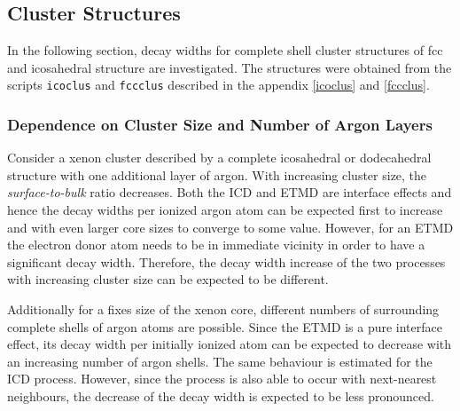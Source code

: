 

\subsection{Cluster Structures}
In the following section, decay widths for complete shell cluster structures
of \ac{fcc} and icosahedral structure are investigated. The structures were
obtained from the scripts \verb|icoclus| and \verb|fccclus| described in
the appendix \ref{icoclus} and \ref{fccclus}.

\subsubsection{Dependence on Cluster Size and Number of Argon Layers}
Consider a xenon cluster described by a complete icosahedral or dodecahedral
structure with one additional layer of argon. With increasing cluster size,
the \emph{surface-to-bulk} ratio decreases. Both the \ac{ICD} and \ac{ETMD}
are interface
effects and hence the decay widths per ionized argon atom can be expected
first to increase and with even larger core sizes
to converge to some value. However, for an \ac{ETMD} the electron donor atom
needs to be in immediate vicinity in order to have a significant decay
width. Therefore, the decay width increase of the two processes with increasing
cluster size can be expected to be different.

Additionally for a fixes size of the xenon core, different numbers of surrounding
complete shells of argon atoms are possible. Since the \ac{ETMD} is a pure
interface effect, its decay width per initially ionized atom can be expected to
decrease with an increasing number of argon shells. The same behaviour
is estimated for the \ac{ICD} process. However, since the process is also
able to occur with next-nearest neighbours, the decrease of the decay width
is expected to be less pronounced.

